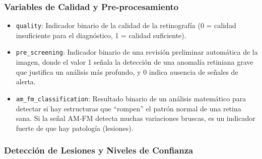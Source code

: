 \subsubsection{Variables de Calidad y Pre-procesamiento}

\begin{itemize}
    \item \texttt{quality}: Indicador binario de la calidad de la retinografía (0 = calidad insuficiente para el diagnóstico, 1 = calidad suficiente).
    \item \texttt{pre\_screening}: Indicador binario de una revisión preliminar automática de la imagen, donde el valor 1 señala la detección de una anomalía retiniana grave que justifica un análisis más profundo, y 0 indica ausencia de señales de alerta.
    \item \texttt{am\_fm\_classification}: Resultado binario de un análisis matemático para detectar si hay estructuras que ``rompen'' el patrón normal de una retina sana. Si la señal AM-FM detecta muchas variaciones bruscas, es un indicador fuerte de que hay patología (lesiones).
\end{itemize}

\subsubsection{Detección de Lesiones y Niveles de Confianza}

